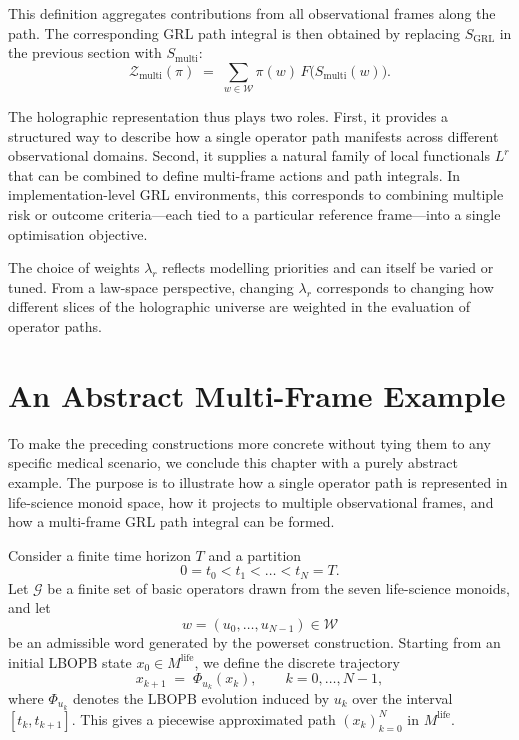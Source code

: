 \documentclass[11pt]{book}
\theoremstyle{plain}
\theoremstyle{definition}
\theoremstyle{remark}
\begin{document}
This definition aggregates contributions from all observational
frames along the path. The corresponding GRL path integral is then
obtained by replacing $S_{\mathrm{GRL}}$ in the previous section with
$S_{\mathrm{multi}}$:
\[
  \mathcal{Z}_{\mathrm{multi}}(\pi)
  \;=\;
  \sum_{w \in \mathcal{W}} \pi(w)\,
  F\bigl(S_{\mathrm{multi}}(w)\bigr).
\]

The holographic representation thus plays two roles. First, it provides
a structured way to describe how a single operator path manifests
across different observational domains. Second, it supplies a natural
family of local functionals $L^{r}$ that can be combined to define
multi-frame actions and path integrals. In implementation-level GRL
environments, this corresponds to combining multiple risk or outcome
criteria—each tied to a particular reference frame—into a single
optimisation objective.

The choice of weights $\lambda_{r}$ reflects modelling priorities and
can itself be varied or tuned. From a law-space perspective, changing
$\lambda_{r}$ corresponds to changing how different slices of the
holographic universe are weighted in the evaluation of operator paths.

\section{An Abstract Multi-Frame Example}


To make the preceding constructions more concrete without tying them
to any specific medical scenario, we conclude this chapter with a
purely abstract example. The purpose is to illustrate how a single
operator path is represented in life-science monoid space, how it
projects to multiple observational frames, and how a multi-frame GRL
path integral can be formed.

Consider a finite time horizon $T$ and a partition
\[
  0 = t_{0} < t_{1} < \dots < t_{N} = T.
\]
Let $\mathcal{G}$ be a finite set of basic operators drawn from the
seven life-science monoids, and let
\[
  w = (u_{0},\dots,u_{N-1}) \in \mathcal{W}
\]
be an admissible word generated by the powerset construction. Starting
from an initial LBOPB state $x_{0} \in M^{\mathrm{life}}$, we define
the discrete trajectory
\[
  x_{k+1}
  \;=\;
  \Phi_{u_{k}}(x_{k}),
  \qquad k = 0,\dots,N-1,
\]
where $\Phi_{u_{k}}$ denotes the LBOPB evolution induced by $u_{k}$
over the interval $[t_{k}, t_{k+1}]$. This gives a piecewise
approximated path $(x_{k})_{k=0}^{N}$ in $M^{\mathrm{life}}$.
\end{document}
